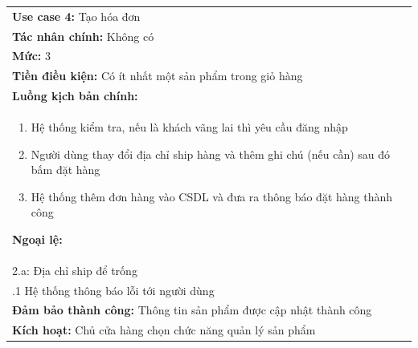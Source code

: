 \begin{center}
\begin{tabularx}{\linewidth}{|X|}
\cline{1-2}
    \textbf{Use case 4:} Tạo hóa đơn\\
    \textbf{Tác nhân chính:} Không có\\
    \textbf{Mức:} 3\\
    \textbf{Tiền điều kiện:} Có ít nhất một sản phẩm trong giỏ hàng\\
    \textbf{Luồng kịch bản chính:}\\
    \begin{enumerate}
        \vspace{-2em}
        \itemsep-0.5em
        \item Hệ thống kiểm tra, nếu là khách vãng lai thì yêu cầu đăng nhập
        \item Người dùng thay đổi địa chỉ ship hàng và thêm ghi chú (nếu cần) sau đó bấm đặt hàng
        \item Hệ thống thêm đơn hàng vào CSDL và đưa ra thông báo đặt hàng thành công
        \vspace{-1em}
    \end{enumerate}
    \textbf{Ngoại lệ:}\\
    \hspace{1em}2.a: Địa chỉ ship để trống\\
    \hspace{2.5em}.1 Hệ thống thông báo lỗi tới người dùng\\
    \textbf{Đảm bảo thành công:} Thông tin sản phẩm được cập nhật thành công\\
    \textbf{Kích hoạt:} Chủ cửa hàng chọn chức năng quản lý sản phẩm
\cline{1-2}
\end{tabularx}
\end{center}

